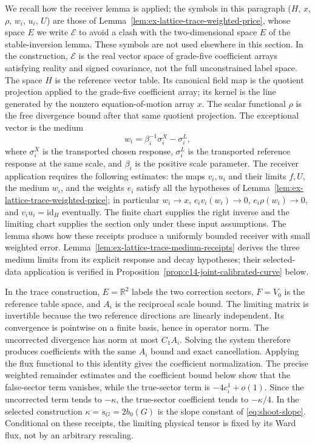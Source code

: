 We recall how the receiver lemma is applied; the symbols in this paragraph
($H$, $x$, $\rho$, $w_i$, $u_i$, $U$) are those of
Lemma~\ref{lem:ex-lattice-trace-weighted-price}, whose space $E$ we write
$\mathcal E$ to avoid a clash with the two-dimensional space $E$ of the
stable-inversion lemma.  These symbols are not used elsewhere in this
section.  In the construction, $\mathcal E$ is the real vector space
of grade-five coefficient arrays satisfying reality and signed covariance,
not the full unconstrained label space. The space $H$ is the reference
vector table. Its canonical
field map is the quotient projection applied to the grade-five coefficient
array; its kernel is the line generated by the nonzero equation-of-motion
array $x$. The scalar functional $\rho$ is the free divergence bound after
that same quotient projection. The exceptional vector is the medium
\[
 w_i=\beta_i^{-1}\sigma_i^X-\sigma_i^L,
\]
where $\sigma_i^X$ is the transported chosen response, $\sigma_i^L$ is the
transported reference response at the same scale, and $\beta_i$ is the
positive scale parameter. The receiver application requires the following estimates:
the maps $v_i,u_i$ and their limits $f,U$, the medium $w_i$, and the
weights $e_i$ satisfy all the hypotheses of
Lemma~\ref{lem:ex-lattice-trace-weighted-price}; in particular
$w_i\to x$, $e_i v_i(w_i)\to0$, $e_i\rho(w_i)\to0$, and
$v_i u_i=\mathrm{id}_H$ eventually. The finite chart supplies the
right inverse and the limiting chart supplies the section only under
these input assumptions. The lemma shows how these receipts produce a uniformly bounded
receiver with small weighted error. Lemma~\ref{lem:ex-lattice-trace-medium-receipts}
derives the three medium limits from its explicit response and decay
hypotheses; their selected-data application is verified in Proposition~\ref{prop:c14-joint-calibrated-curve} below.

In the trace construction, $E=\mathbb R^2$ labels the two correction sectors,
$F=V_0$ is the reference table space, and $A_i$ is the reciprocal scale
bound. The limiting matrix is invertible because the two reference
directions are linearly independent. Its convergence is pointwise on a
finite basis, hence in operator norm. The uncorrected divergence has norm at
most $C_1A_i$. Solving the system therefore produces coefficients with the
same $A_i$ bound and exact cancellation. Applying the flux functional to this
identity gives the coefficient normalization. The precise weighted remainder
estimates and the coefficient bound below show that the false-sector term
vanishes, while the true-sector term is $-4c_i^1+o(1)$. Since the
uncorrected term tends to $-\kappa$, the true-sector coefficient tends to
$-\kappa/4$. In the selected construction $\kappa=s_G=2b_0(G)$ is the slope constant of \eqref{eq:shoot-slope}.
Conditional on these receipts, the limiting physical tensor is fixed by its Ward flux,
not by an arbitrary rescaling.

